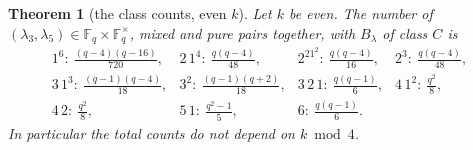 \documentclass[12pt,a4paper]{amsart}
\newtheorem{theorem}{Theorem}[section]
\theoremstyle{definition}
\newcommand{\F}{\mathbb{F}}
\begin{document}
\begin{theorem}[the class counts, even $k$]\label{thm:countseven}
Let $k$ be even. The number of $(\lambda_3,\lambda_5)\in\F_q\times\F_q^\times$, mixed and pure pairs together, with $B_\lambda$ of class $C$ is
\[
\begin{array}{llll}
1^6:\ \tfrac{(q-4)(q-16)}{720}, & 2\,1^4:\ \tfrac{q(q-4)}{48}, & 2^21^2:\ \tfrac{q(q-4)}{16}, & 2^3:\ \tfrac{q(q-4)}{48},\\[0.5ex]
3\,1^3:\ \tfrac{(q-1)(q-4)}{18}, & 3^2:\ \tfrac{(q-1)(q+2)}{18}, & 3\,2\,1:\ \tfrac{q(q-1)}{6}, & 4\,1^2:\ \tfrac{q^2}{8},\\[0.5ex]
4\,2:\ \tfrac{q^2}{8}, & 5\,1:\ \tfrac{q^2-1}{5}, & 6:\ \tfrac{q(q-1)}{6}. &
\end{array}
\]
In particular the total counts do not depend on $k\bmod4$.
\end{theorem}
\end{document}
